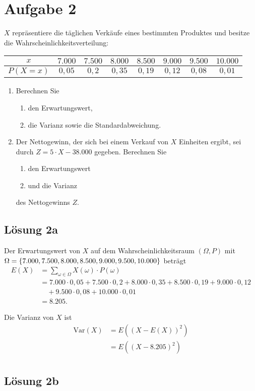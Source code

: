 \documentclass[main.tex]{subfiles}
\begin{document}
\section{Aufgabe 2}
$X$ repräsentiere die täglichen Verkäufe eines bestimmten Produktes und besitze die Wahrscheinlichkeitsverteilung:
\begin{center}
\begin{tabular}{c|c|c|c|c|c|c|c}
	$x$        & $7.000$ & $7.500$ & $8.000$ & $8.500$ & $9.000$ & $9.500$ & $10.000$ \\ 
	\hline
	$P(X {=} x)$ &  $0,05$ &   $0,2$ &  $0,35$ &  $0,19$ &  $0,12$ &  $0,08$ &   $0,01$ \\
\end{tabular}
\end{center}
\begin{enumerate}
\item Berechnen Sie  
\begin{enumerate}
  	\item den Erwartungswert,  
  	\item die Varianz sowie die Standardabweichung.
\end{enumerate}
\item Der Nettogewinn, der sich bei einem Verkauf von $X$ Einheiten ergibt, sei durch $Z = 5 \cdot X - 38.000$ gegeben. Berechnen Sie 
\begin{enumerate}
  	\item den Erwartungswert  
  	\item und die Varianz
\end{enumerate}
des Nettogewinns $Z$.
\end{enumerate}

\subsection{Lösung 2a}
Der Erwartungswert von $X$ auf dem Wahrscheinlichkeitsraum $(\Omega, P)$ mit $\Omega = \set*{7.000, 7.500, 8.000, 8.500, 9.000, 9.500, 10.000}$ beträgt $$\begin{aligned}
	E(X) &= \sum\limits_{\omega\in\Omega} X(\omega)\cdot P(\omega) \\
	&= 7.000\cdot 0,05 + 7.500\cdot 0,2 + 8.000 \cdot 0,35 + 8.500\cdot 0,19 + 9.000\cdot 0,12 \\
	&\quad + 9.500\cdot 0,08 + 10.000\cdot 0,01 \\
	&= 8.205.
\end{aligned}$$

Die Varianz von $X$ ist 
$$\begin{aligned}
	\text{Var}(X) &= E((X - E(X))^2) \\
	&= E((X - 8.205)^2) \\
\end{aligned}$$

\subsection{Lösung 2b}
\end{document}
